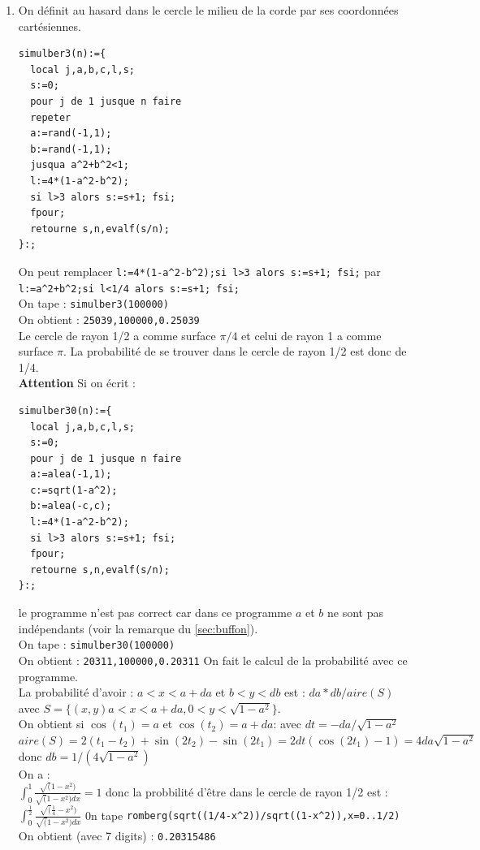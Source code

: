 \documentclass[a4paper,11pt]{book}
\begin{document}
\begin{enumerate}
  On tape :
\begin{verbatim}
simulber2(n):={
  local j,a,b,d,l,s;
  s:=0;
  pour j de 1 jusque n faire
  a:=rand(-pi,pi);
  d:=rand(0,pi);
  b:=pi+2*d-a;
  l:=2-2*cos(a-b);
  si l>3 alors s:=s+1; fsi
  fpour
  retourne s,n,evalf(s/n);
}:;
\end{verbatim}
On tape :
{\tt simulber2(100000)}\\
On obtient : {\tt 33264,100000,0.33264}\\
On a le m\^eme r\'esultat qu'en 1, puisque c'est pratiquement le m\^eme 
programme.
\item On d\'efinit au hasard dans le cercle le milieu de la corde par ses 
  coordonn\'ees cart\'esiennes.
\begin{verbatim}
simulber3(n):={
  local j,a,b,c,l,s;
  s:=0;
  pour j de 1 jusque n faire
  repeter
  a:=rand(-1,1);
  b:=rand(-1,1);
  jusqua a^2+b^2<1;
  l:=4*(1-a^2-b^2);
  si l>3 alors s:=s+1; fsi;
  fpour;
  retourne s,n,evalf(s/n);
}:;
\end{verbatim}
On peut remplacer 
{\tt l:=4*(1-a\verb|^|2-b\verb|^|2);si l>3 alors s:=s+1; fsi;} par \\
{\tt l:=a\verb|^|2+b\verb|^|2;si l<1/4 alors s:=s+1; fsi;}\\
On tape :
{\tt simulber3(100000)}\\
On obtient : {\tt 25039,100000,0.25039}\\
Le cercle de rayon 1/2 a comme surface $\pi/4$ et celui de rayon 1 a comme 
surface $\pi$. La probabilit\'e de se trouver dans le cercle de rayon 1/2 est 
donc de 1/4.\\
{\bf Attention} Si on \'ecrit :
\begin{verbatim}
simulber30(n):={
  local j,a,b,c,l,s;
  s:=0;
  pour j de 1 jusque n faire
  a:=alea(-1,1);
  c:=sqrt(1-a^2);
  b:=alea(-c,c);
  l:=4*(1-a^2-b^2);
  si l>3 alors s:=s+1; fsi;
  fpour;
  retourne s,n,evalf(s/n);
}:;
\end{verbatim}
le programme n'est pas correct car dans ce programme $a$ et $b$ ne sont pas 
ind\'ependants (voir la remarque du \ref{sec:buffon}).\\
On tape :
{\tt simulber30(100000)}\\
On obtient : {\tt 20311,100000,0.20311}
On fait le calcul de la probabilit\'e avec ce programme.\\
La probabilit\'e d'avoir : $a<x<a+da$ et $b<y<db$ est :
$da*db/aire(S)$ avec $S=\{(x,y) a<x<a+da,0<y<\sqrt{1-a^2}\}$.\\
On obtient si $\cos(t_1)=a$ et $\cos(t_2)=a+da$: avec $dt=-da/\sqrt{1-a^2}$\\
$aire(S)=2(t_1-t_2)+\sin(2t_2)-\sin(2t_1)=2dt(\cos(2t_1)-1)=4da\sqrt{1-a^2}$
donc $db=1/(4\sqrt{1-a^2})$\\
On a :\\
$\int_0^1\frac{\sqrt(1-x^2)}{\sqrt(1-x^2)dx}=1$ donc la probbilit\'e d'\^etre
dans le cercle de rayon 1/2 est :\\
$\int_0^{\frac{1}{2}}\frac{\sqrt(\frac{1}{4}-x^2)}{\sqrt(1-x^2)dx}$
0n tape 
{\tt romberg(sqrt((1/4-x\verb|^|2))/sqrt((1-x\verb|^|2)),x=0..1/2)} \\
On obtient (avec 7 digits) : {\tt 0.20315486}


\end{enumerate}
\end{document}
